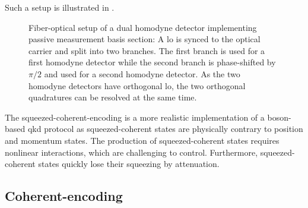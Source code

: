 Such a setup is illustrated in .
\begin{figure}[htb]
	\centering
	
	\caption{Fiber-optical setup of a dual homodyne detector implementing passive measurement basis section: A \gls{lo} is synced to the optical carrier and split into two branches. The first branch is used for a first homodyne detector while the second branch is phase-shifted by $\pi/2$ and used for a second homodyne detector. As the two homodyne detectors have orthogonal \gls{lo}, the two orthogonal quadratures can be resolved at the same time.}\label{fig:coherent_receiver_passive}
\end{figure}
The squeezed-coherent-encoding is a more realistic implementation of a boson-based \gls{qkd} protocol as squeezed-coherent states are physically contrary to position and momentum states.
The production of squeezed-coherent states requires nonlinear interactions, which are challenging to control.
Furthermore, squeezed-coherent states quickly lose their squeezing by attenuation.

\FloatBarrier
\subsection{Coherent-encoding}


